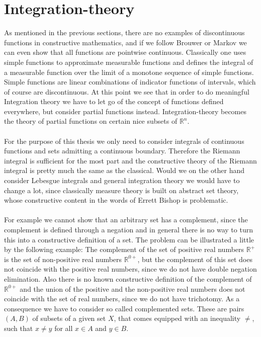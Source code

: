 \documentclass[11pt,a4paper,leqno]{report}
\numberwithin{equation}{chapter}
\begin{document}
\section{Integration-theory}
As mentioned in the previous sections, there are no examples of discontinuous functions in constructive mathematics, and if we follow Brouwer or Markov we can even show that all functions are pointwise continuous. Classically one uses simple functions to approximate measurable functions and defines the integral of a measurable function over the limit of a monotone sequence of simple functions. Simple functions are linear combinations of indicator functions of intervals, which of course are discontinuous. At this point we see that in order to do meaningful Integration theory we have to let go of the concept of functions defined everywhere, but consider partial functions instead. Integration-theory becomes the theory of partial functions on certain nice subsets of $\mathbb{R}^n$.\\
\\
For the purpose of this thesis we only need to consider integrals of continuous functions and sets admitting a continuous boundary. Therefore the Riemann integral is sufficient for the most part and the constructive theory of the Riemann integral is pretty much the same as the classical. Would we on the other hand consider Lebesgue integrals and general integration theory we would have to change a lot, since classically measure theory is built on abstract set theory, whose constructive content in the words of Errett Bishop is problematic.\\
\\
For example we cannot show that an arbitrary set has a complement, since the complement is defined through a negation and in general there is no way to turn this into a constructive definition of a set. The problem can be illustrated a little by the following example: The complement of the set of positive real numbers $\mathbb{R}^+$ is the set of non-positive real numbers $\mathbb{R}^{0+}$, but the complement of this set does not coincide with the positive real numbers, since we do not have double negation elimination. Also there is no known constructive definition of the complement of $\mathbb{R}^{0+}$ and the union of the positive and the non-positive real numbers does not coincide with the set of real numbers, since we do not have trichotomy. As a consequence we have to consider so called complemented sets. These are pairs $(A,B)$ of subsets of a given set $X$, that comes equipped with an inequality $\neq$, such that $x\neq y$ for all $x\in A$ and $y\in B$\cite{CANA}.\\
\end{document}

